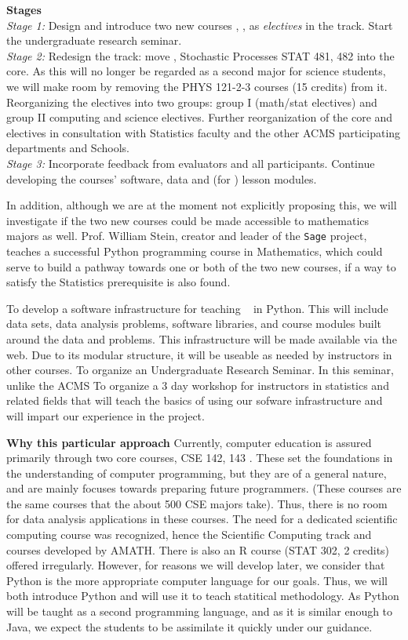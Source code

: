 {\bf Stages}\\
{\em Stage 1:} Design and introduce two new courses \statcl, \astrocl, as {\em electives} in the track. Start the undergraduate research seminar.\\
{\em Stage 2:} Redesign the track: move \statcl, Stochastic Processes {\sc STAT 481, 482} into the core. As this will no longer be regarded as a second major for science students, we will make room by removing the {\sc PHYS 121-2-3} courses (15 credits) from it. Reorganizing the electives into two groups: group I (math/stat electives) and group II computing and science electives. Further reorganization of the core and electives in consultation with Statistics faculty and the other ACMS participating departments and Schools.\\
{\em Stage 3:} Incorporate feedback from evaluators and all participants. Continue developing the courses' software, data and (for \statcl) lesson modules.

In addition, although we are at the moment not explicitly proposing this, we will investigate if the two new courses could be made accessible to mathematics  majors as well. Prof. William Stein, creator and leader of the {\tt Sage} project, teaches a successful Python programming course in Mathematics, which could serve to build a pathway towards one or both of the two new courses, if a way to satisfy the Statistics prerequisite is also found.

To develop a software infrastructure for teaching \cdse~ in
  Python. This will include data sets, data analysis problems,
  software libraries, and course modules built around the data and
  problems. This infrastructure will be made available via the
  web. Due to its modular structure, it will be useable as needed by
  instructors in other courses.
 To organize an Undergraduate Research Seminar. In this seminar, unlike the ACMS 
 To organize a 3 day workshop for instructors in statistics and related fields that will teach the basics of using our sofware infrastructure and will impart our experience in the project.




{\bf Why this particular approach} Currently, computer education is
assured primarily through two core courses, {\sc CSE 142, 143}
\cite{cse142}. These set the foundations in the understanding of
computer programming, but they are of a general nature, and are mainly
focuses towards preparing future programmers. (These courses are the
same courses that the about 500 CSE majors take). Thus, there is no
room for data analysis applications in these courses. The need for a
dedicated scientific computing course was recognized, hence the
Scientific Computing track and courses developed by AMATH. There is
also an R course ({\sc STAT 302}, 2 credits) offered irregularly.
However, for reasons we will develop later, we consider that Python is
the more appropriate computer language for our goals. Thus, we will
both introduce Python and will use it to teach statitical methodology.
As Python will be taught as a second programming language, and as it
is similar enough to Java, we expect the students to be assimilate it
quickly under our guidance.



